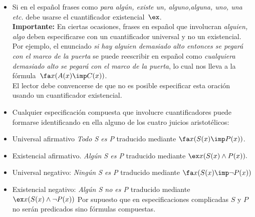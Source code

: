 \documentclass[11pt,letterpaper]{article}
\begin{document}
\begin{itemize}
 \item Si en el español frases como \textit{para alg\'un, existe un, 
  alguno,alguna, uno, una etc.} debe usarse el cuantificador 
  existencial~$\ex$.\\ 
  \textbf{Importante:} En ciertas ocasiones, frases en español que
  involucran \textit{alguien, algo} deben especificarse con un cuantificador 
  universal y no un existencial. \\
  Por ejemplo, el enunciado \textit{si hay alguien demasiado alto entonces se 
  pegará con el marco de la puerta} se puede reescribir en español como
  \textit{cualquiera demasiado alto se pegará con el marco de la puerta},
  lo cual nos lleva a la f\'ormula~$\fa x(A(x)\imp C(x))$.\\
  El lector debe convencerse de que no es posible especificar esta oración 
  usando un cuantificador existencial. 

 \item Cualquier especificación compuesta que involucre cuantificadores puede
  formarse identificando en ella alguno de los cuatro juicios aristotélicos:
  \bi
   \item Universal afirmativo \textit{Todo S es P} traducido mediante
    $\fa x(S(x)\imp P(x))$.
   \item Existencial afirmativo. \textit{Alg\'un S es P} traducido mediante
    $\ex x(S(x)\land P(x)).$
   \item Universal negativo: \textit{Ning\'un S es P} traducido mediante 
    $\fa x(S(x)\imp \neg P(x))$
   \item Existencial negativo:  \textit{Alg\'un S no es P} traducido mediante
    $\ex x(S(x)\land \neg P(x))$
  \ei
  Por supuesto que en especificaciones complicadas $S$ y $P$ no serán predicados
  sino fórmulas compuestas.


\end{itemize}
\end{document}
